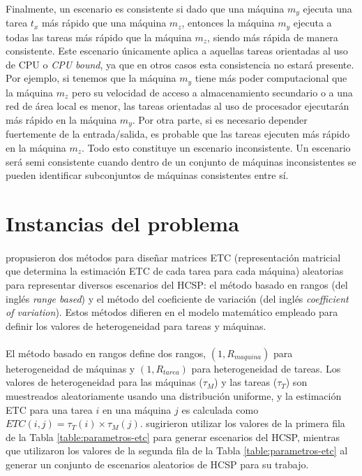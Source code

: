 \paragraph{}Finalmente, un escenario es consistente si dado que una máquina $m_y$ ejecuta una tarea $t_x$ más rápido que una máquina $m_z$, entonces la máquina $m_y$ ejecuta a todas las tareas más rápido que la máquina $m_z$, siendo más rápida de manera consistente.
Este escenario únicamente aplica a aquellas tareas orientadas al uso de CPU o \textit{CPU bound}, ya que en otros casos esta consistencia no estará presente.
Por ejemplo, si tenemos que la máquina $m_y$ tiene más poder computacional que la máquina $m_z$ pero su velocidad de acceso a almacenamiento secundario o a una red de área local es menor, las tareas orientadas al uso de procesador ejecutarán más rápido en la máquina $m_y$.
Por otra parte, si es necesario depender fuertemente de la entrada/salida, es probable que las tareas ejecuten más rápido en la máquina $m_z$.
Todo esto constituye un escenario inconsistente.
Un escenario será semi consistente cuando dentro de un conjunto de máquinas inconsistentes se pueden identificar subconjuntos de máquinas consistentes entre sí.

\section{Instancias del problema} \label{section:descripcion-problema,subsection:instancias-del-problema}

\paragraph{}\citet{bib-ali-hc-etc} propusieron dos métodos para diseñar matrices ETC (representación matricial que determina la estimación ETC de cada tarea para cada máquina) aleatorias para representar diversos escenarios del HCSP: el método basado en rangos (del inglés \textit{range based}) y el método del coeficiente de variación (del inglés \textit{coefficient of variation}). Estos métodos difieren en el modelo matemático empleado para definir los valores de heterogeneidad para tareas y máquinas.

\paragraph{}El método basado en rangos define dos rangos, $(1, R_{maquina})$ para heterogeneidad de máquinas y $(1, R_{tarea})$ para heterogeneidad de tareas.
Los valores de heterogeneidad para las máquinas ($\tau_{M}$) y las tareas ($\tau_{T}$) son muestreados aleatoriamente usando una distribución uniforme, y la estimación ETC para una tarea $i$ en una máquina $j$ es calculada como $ETC(i,j) = \tau_{T}(i) \times \tau_{M}(j)$.
\citet{bib-ali-hc-etc} sugirieron utilizar los valores de la primera fila de la Tabla \ref{table:parametros-etc} para generar escenarios del HCSP, mientras que \citet{bib-braun} utilizaron los valores de la segunda fila de la Tabla \ref{table:parametros-etc} al generar un conjunto de escenarios aleatorios de HCSP para su trabajo.

